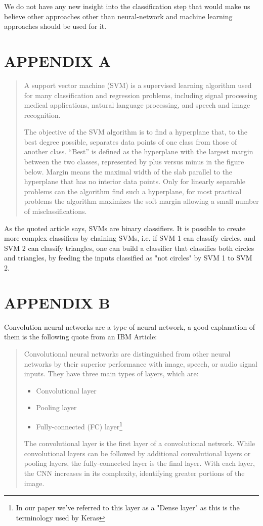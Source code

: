 \documentclass[conference]{IEEEtran}
\begin{document}
We do not have any new insight into the classification step that would make us believe other approaches other
than neural-network and machine learning approaches should be used for it.

\section*{APPENDIX A}\label{appendixa}
\blockcquote[Support Vector Machine (SVM) Explained - MATLAB \& Simulink]{matlabsvm}{
A support vector machine (SVM) is a supervised learning algorithm used for many classification and regression problems, including signal processing  medical applications, natural language processing, and speech and image recognition.

The objective of the SVM algorithm is to find a hyperplane that, to the best degree possible, separates data points of one class from those of another class. “Best” is defined as the hyperplane with the largest margin between the two classes, represented by plus versus minus in the figure below. Margin means the maximal width of the slab parallel to the hyperplane that has no interior data points. Only for linearly separable problems can the algorithm find such a hyperplane, for most practical problems the algorithm maximizes the soft margin allowing a small number of misclassifications.
}

As the quoted article says, SVMs are binary classifiers. It is possible to create more complex
classifiers by chaining SVMs, i.e. if SVM 1 can classify circles, and SVM 2 can classify triangles,
one can build a classifier that classifies both circles and triangles, by feeding the inputs classified
as "not circles" by SVM 1 to SVM 2.

\section*{APPENDIX B}\label{appendix-cnn}

Convolution neural networks are a type of neural network, a good explanation of them is the following quote
from an IBM Article:

\blockcquote[What are convolutional neural networks?]{ibm-article}{Convolutional neural networks are distinguished from other neural networks by their superior performance with image, speech, or audio signal inputs. They have three main types of layers, which are:

\begin{itemize}
    \item Convolutional layer
    \item Pooling layer
    \item Fully-connected (FC) layer\footnote{In our paper we've referred to this layer as a "Dense layer" as this is the terminology used by Keras}
\end{itemize}

The convolutional layer is the first layer of a convolutional network. While convolutional layers can be followed by additional convolutional layers or pooling layers, the fully-connected layer is the final layer. With each layer, the CNN increases in its complexity, identifying greater portions of the image.
}




\end{document}
